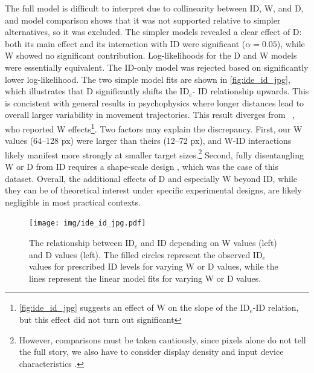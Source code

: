 \documentclass[acmlarge, manuscript,review]{acmart}
\newcommand{\ide}{\ensuremath{{\text{ID}_e}}\xspace}
\begin{document}
The full model is difficult to interpret due to collinearity between ID, W, and D, and model comparison shows that it was not supported relative to simpler alternatives, so it was excluded. The simpler models revealed a clear effect of D: both its main effect and its interaction with ID were significant ($\alpha=0.05$), while W showed no significant contribution. Log-likelihoods for the D and W models were essentially equivalent. The ID-only model was rejected based on significantly lower log-likelihood.
The two simple model fits are shown in \autoref{fig:ide_id_jpg}, which illustrates that D significantly shifts the \ide - ID relationship upwards. This is concistent with general results in psychophysics where longer distances lead to overall larger variability in movement trajectories. 
This result diverges from \citeauthor{zhai2004nominal}~\cite{zhai2004nominal}, who reported W effects\footnote{\autoref{fig:ide_id_jpg} suggests an effect of W on the slope of the \ide-ID relation, but this effect did not turn out significant}. Two factors may explain the discrepancy. First, our W values (64--128 px) were larger than theirs (12--72 px), and W-ID interactions likely manifest more strongly at smaller target sizes.\footnote{However, comparisons must be taken cautiously, since pixels alone do not tell the full story, we also have to consider display density and input device characteristics \cite{casiez2011}.} Second, fully disentangling W or D from ID requires a shape-scale design \cite{gori2018chi, guiard2009}, which was the case of this dataset.
Overall, the additional effects of D and especially W beyond ID, while they can be of theoretical interest under specific experimental designs, are likely negligible in most practical contexts.



\begin{figure}[htbp]
	\centering
	\texttt{[image: img/ide\_id\_jpg.pdf]}
	\caption{The relationship between \ide and ID depending on W values (left) and D values (left). The filled circles represent the observed \ide values for prescribed ID levels for varying W or D values, while the lines represent the linear model fits for varying W or D values.}
	\label{fig:ide_id_jpg}
\end{figure}
\end{document}
